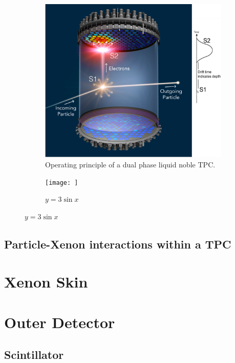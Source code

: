 \begin{figure}
     \centering
     \begin{subfigure}[b]{0.5\textwidth}
         \centering
         \includegraphics[width=\textwidth]{figures/LZ/IDOf_Xe_TPC2.jpg}
         \caption{Operating principle of a dual phase liquid noble TPC. \cite{LZTDR}}
         \label{fig:y equals x}
     \end{subfigure}
     \hfill
     \begin{subfigure}[b]{0.5\textwidth}
         \centering
         \texttt{[image: ]}
         \caption{$y=3\sin x$}
         \label{fig:three sin x}
     \end{subfigure}
\end{figure}

\subsection{Particle-Xenon interactions within a TPC}


\section{Xenon Skin}

\section{Outer Detector}
\subsection{Scintillator}
